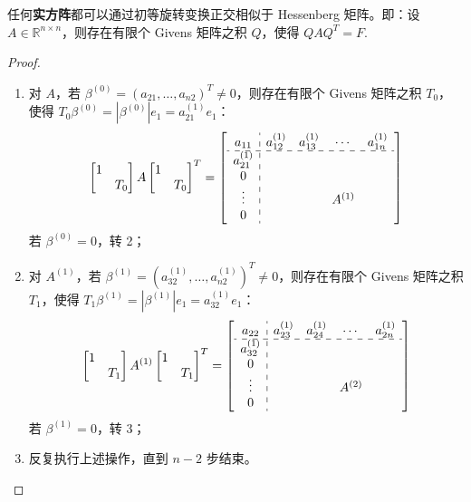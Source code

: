 \begin{theorem}
\label{thm:hessenberg}
任何\textbf{实方阵}都可以通过初等旋转变换正交相似于 Hessenberg 矩阵。即：设 $A\in\mathbb R^{n\times n}$，则存在有限个 Givens 矩阵之积 $Q$，使得 $QAQ^T=F$.
\end{theorem}
\begin{proof}
\begin{enumerate}
    \item 对 $A$，若 $\beta^{(0)}=(a_{21},\ldots,a_{n2})^T\neq0$，则存在有限个 Givens 矩阵之积 $T_0$，使得 $T_0\beta^{(0)}=|\beta^{(0)}|e_1=a_{21}^{(1)}e_1$：
    \[
    \begin{bmatrix}1&\\&T_0\end{bmatrix}A\begin{bmatrix}1&\\&T_0\end{bmatrix}^T=
    \left[\begin{array}{c:cccc}
    a_{11}&a_{12}^{(1)}&a_{13}^{(1)}&\cdots&a_{1n}^{(1)}\\
    \hdashline a_{21}^{(1)}&&&&\\
    0&&&&\\
    \vdots&&&A^{(1)}&\\
    0&&&&
    \end{array}\right]
    \]
    若 $\beta^{(0)}=0$，转 2；

    \item 对 $A^{(1)}$，若 $\beta^{(1)}=(a_{32}^{(1)},\ldots,a_{n2}^{(1)})^T\neq0$，则存在有限个 Givens 矩阵之积 $T_1$，使得 $T_1\beta^{(1)}=|\beta^{(1)}|e_1=a_{32}^{(1)}e_1$：
    \[
        \begin{bmatrix}1&\\&T_1\end{bmatrix}A^{(1)}\begin{bmatrix}1&\\&T_1\end{bmatrix}^T=
        \left[\begin{array}{c:cccc}
        a_{22}&a_{23}^{(1)}&a_{24}^{(1)}&\cdots&a_{2n}^{(1)}\\
        \hdashline a_{32}^{(1)}&&&&\\
        0&&&&\\
        \vdots&&&A^{(2)}&\\
        0&&&&
        \end{array}\right]
    \]
    若 $\beta^{(1)}=0$，转 3；

    \item 反复执行上述操作，直到 $n-2$ 步结束。


\end{enumerate}
\end{proof}
